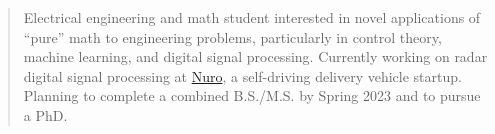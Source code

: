 \documentclass[10pt,a4paper,ragged2e,withhyper]{altacv}
\begin{document}


\makecvheader


\begin{quote}
Electrical engineering and math student interested in novel applications of ``pure'' math to engineering problems, particularly in control theory, machine learning, and digital signal processing. Currently working on radar digital signal processing at \href{https://nuro.ai/}{Nuro}, a self-driving delivery vehicle startup. Planning to complete a combined B.S./M.S. by Spring 2023 and to pursue a PhD.
\end{quote}

\vspace{0.25cm}
\end{document}
